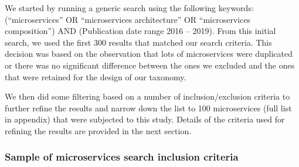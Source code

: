 \documentclass{article}
\begin{document}
We started by running a generic search using the following keywords: (“microservices” OR “microservices architecture” OR “microservices composition”) AND (Publication date range 2016 – 2019). From this initial search, we used the first 300 results that matched our search criteria. This decision was based on the observation that lots of microservices were duplicated or there was no significant difference between the ones we excluded and the ones that were retained for the design of our taxonomy.

We then did some filtering based on a number of inclusion/exclusion criteria to further refine the results and narrow down the list to 100 microservices (full list in appendix) that were subjected to this study. Details of the criteria used for refining the results are provided in the next section.

\subsubsection{Sample of microservices search inclusion criteria}
\end{document}
